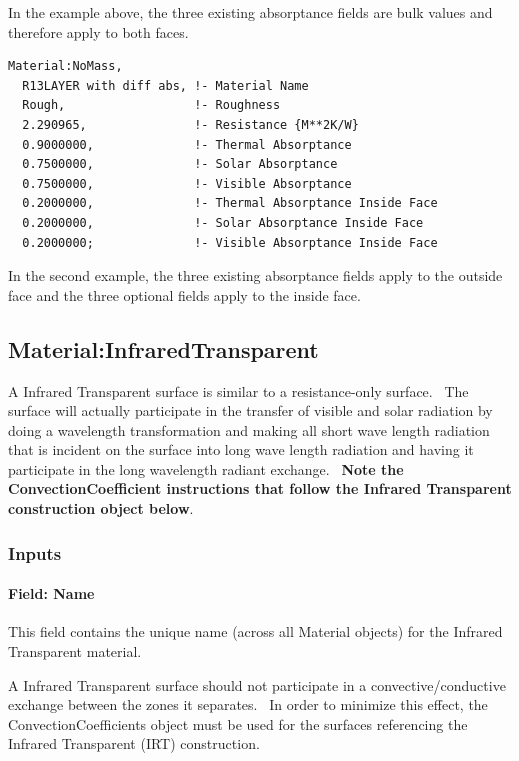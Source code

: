 In the example above, the three existing absorptance fields are bulk values and therefore apply to both faces.

\begin{lstlisting}
Material:NoMass,
  R13LAYER with diff abs, !- Material Name
  Rough,                  !- Roughness
  2.290965,               !- Resistance {M**2K/W}
  0.9000000,              !- Thermal Absorptance
  0.7500000,              !- Solar Absorptance
  0.7500000,              !- Visible Absorptance
  0.2000000,              !- Thermal Absorptance Inside Face
  0.2000000,              !- Solar Absorptance Inside Face
  0.2000000;              !- Visible Absorptance Inside Face
\end{lstlisting}

In the second example, the three existing absorptance fields apply to the outside face and the three optional fields apply to the inside face.

\subsection{Material:InfraredTransparent}\label{materialinfraredtransparent}

A Infrared Transparent surface is similar to a resistance-only surface.~ The surface will actually participate in the transfer of visible and solar radiation by doing a wavelength transformation and making all short wave length radiation that is incident on the surface into long wave length radiation and having it participate in the long wavelength radiant exchange.~ \textbf{Note the ConvectionCoefficient instructions that follow the Infrared Transparent construction object below}.

\subsubsection{Inputs}\label{inputs-2-040}

\paragraph{Field: Name}\label{field-name-2-037}

This field contains the unique name (across all Material objects) for the Infrared Transparent material.

A Infrared Transparent surface should not participate in a convective/conductive exchange between the zones it separates.~ In order to minimize this effect, the ConvectionCoefficients object must be used for the surfaces referencing the Infrared Transparent (IRT) construction.

